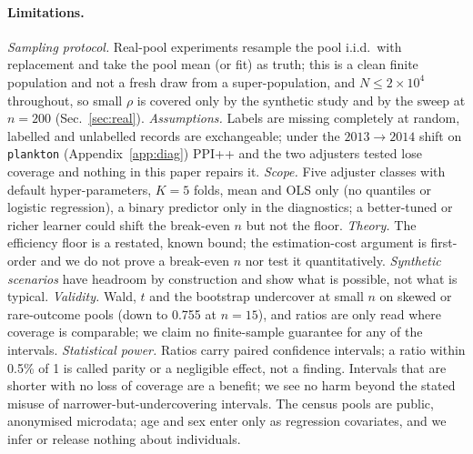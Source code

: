 \paragraph{Limitations.}
\emph{Sampling protocol.} Real-pool experiments resample the pool i.i.d.\ with replacement and take the pool mean (or fit) as truth; this is a clean finite population and not a fresh draw from a super-population, and $N\le2\times10^4$ throughout, so small $\rho$ is covered only by the synthetic study and by the sweep at $n=200$ (Sec.~\ref{sec:real}).
\emph{Assumptions.} Labels are missing completely at random, labelled and unlabelled records are exchangeable; under the $2013\to2014$ shift on \texttt{plankton} (Appendix~\ref{app:diag}) PPI++ and the two adjusters tested lose coverage and nothing in this paper repairs it.
\emph{Scope.} Five adjuster classes with default hyper-parameters, $K=5$ folds, mean and OLS only (no quantiles or logistic regression), a binary predictor only in the diagnostics; a better-tuned or richer learner could shift the break-even $n$ but not the floor.
\emph{Theory.} The efficiency floor is a restated, known bound; the estimation-cost argument is first-order and we do not prove a break-even $n$ nor test it quantitatively. \emph{Synthetic scenarios} have headroom by construction and show what is possible, not what is typical.
\emph{Validity.} Wald, $t$ and the bootstrap undercover at small $n$ on skewed or rare-outcome pools (down to 0.755 at $n=15$), and ratios are only read where coverage is comparable; we claim no finite-sample guarantee for any of the intervals.
\emph{Statistical power.} Ratios carry paired confidence intervals; a ratio within 0.5\% of 1 is called parity or a negligible effect, not a finding.
Intervals that are shorter with no loss of coverage are a benefit; we see no harm beyond the stated misuse of narrower-but-undercovering intervals. The census pools are public, anonymised microdata; age and sex enter only as regression covariates, and we infer or release nothing about individuals.

